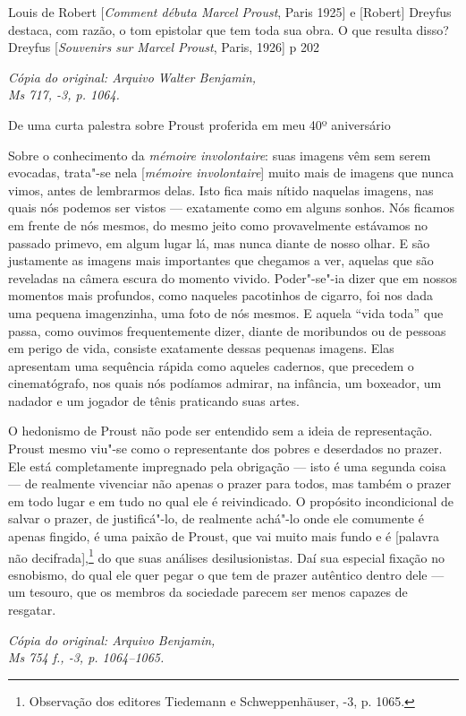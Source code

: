 Louis de Robert {[}\emph{Comment débuta Marcel Proust}, Paris 1925{]} e
{[}Robert{]} Dreyfus destaca, com razão, o tom epistolar que tem toda
sua obra. O que resulta disso? Dreyfus {[}\emph{Souvenirs sur Marcel
Proust}, Paris, 1926{]} p 202

\begin{flushright}
\emph{\footnotesize{Cópia do original: Arquivo Walter Benjamin,\\ Ms 717, -3, p. 1064.}}
\end{flushright}

De uma curta palestra sobre Proust proferida em meu 40º aniversário

Sobre o conhecimento da \emph{mémoire involontaire}: suas imagens vêm
sem serem evocadas, trata"-se nela {[}\emph{mémoire
involontaire}{]} muito mais de imagens que nunca vimos, antes de
lembrarmos delas. Isto fica mais nítido naquelas imagens, nas quais nós
podemos ser vistos --- exatamente como em alguns sonhos. Nós ficamos em
frente de nós mesmos, do mesmo jeito como provavelmente estávamos no
passado primevo, em algum lugar lá, mas nunca diante de nosso olhar. E
são justamente as imagens mais importantes que chegamos a ver, aquelas
que são reveladas na câmera escura do momento vivido. Poder"-se"-ia dizer
que em nossos momentos mais profundos, como naqueles pacotinhos de
cigarro, foi nos dada uma pequena imagenzinha, uma foto de nós mesmos. E
aquela ``vida toda'' que passa, como ouvimos frequentemente dizer,
diante de moribundos ou de pessoas em perigo de vida, consiste
exatamente dessas pequenas imagens. Elas apresentam uma sequência rápida
como aqueles cadernos, que precedem o cinematógrafo, nos quais nós
podíamos admirar, na infância, um boxeador, um nadador e um jogador de
tênis praticando suas artes.

O hedonismo de Proust não pode ser entendido sem a ideia de
representação. Proust mesmo viu"-se como o representante dos pobres e
deserdados no prazer. Ele está completamente impregnado pela obrigação
--- isto é uma segunda coisa --- de realmente vivenciar não apenas o
prazer para todos, mas também o prazer em todo lugar e em tudo no qual
ele é reivindicado. O propósito incondicional de salvar o prazer, de
justificá"-lo, de realmente achá"-lo onde ele comumente é apenas fingido,
é uma paixão de Proust, que vai muito mais fundo e é {[}palavra não
decifrada{]},\footnote{Observação dos editores Tiedemann e
  Schweppenhäuser, -3, p. 1065. \versal{[N.~O.]}} do que suas análises
desilusionistas. Daí sua especial fixação no esnobismo, do qual ele quer
pegar o que tem de prazer autêntico dentro dele --- um tesouro, que os
membros da sociedade parecem ser menos capazes de resgatar.

\begin{flushright}
\emph{\footnotesize{Cópia do original: Arquivo Benjamin,\\ Ms 754 f., -3, p. 1064--1065.}} \enlargethispage{\baselineskip}
\end{flushright}
